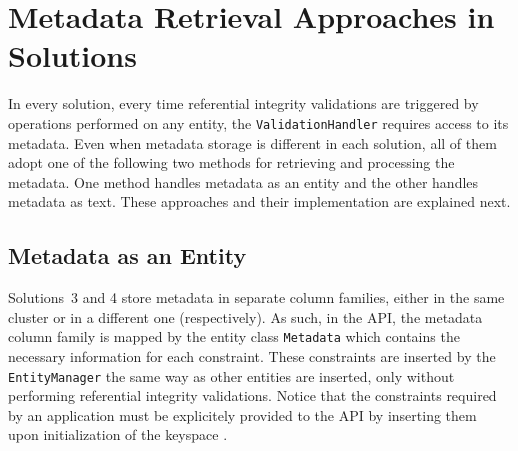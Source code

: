 \section{Metadata Retrieval Approaches in Solutions}
\label{s:implementation-MDinSolutions}

In every solution,  every time referential integrity validations are triggered
by operations  performed  on  any entity,  the
\texttt{ValidationHandler} requires access to its  metadata. Even when metadata
storage is different in each solution, all of them adopt  
 one of the following two methods for retrieving and processing the
metadata. One method handles metadata as an entity and the other handles
metadata as text. These approaches and their implementation 
are explained next.


% 

 
\subsection{Metadata as an Entity} \label{ss:implementation-MDEntityClass}
Solutions~3 and 4 store  metadata in separate column families, either in the
same cluster or in a different one (respectively).  As such, in the \ac{API},
the metadata column family is mapped by the entity class \texttt{Metadata} which contains the
necessary information for each constraint.  These constraints are inserted 
by the \texttt{EntityManager} the same way as other entities are inserted, only
without performing referential integrity validations. Notice that the
constraints required by an application must be explicitely provided to the
\ac{API} by inserting them upon initialization of the keyspace .

